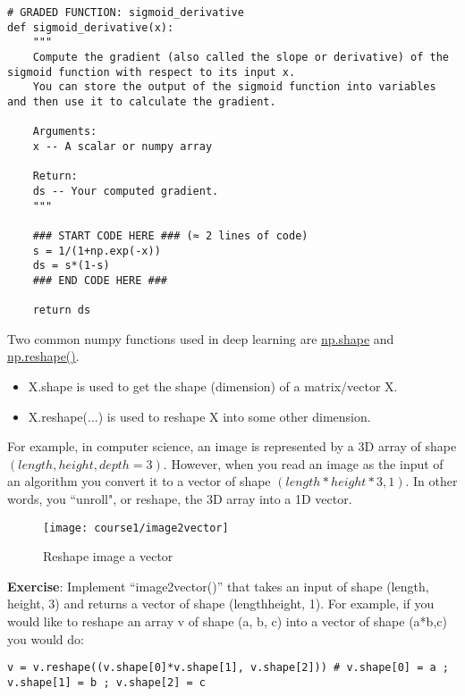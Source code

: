 \begin{verbatim}
# GRADED FUNCTION: sigmoid_derivative
def sigmoid_derivative(x):
    """
    Compute the gradient (also called the slope or derivative) of the sigmoid function with respect to its input x.
    You can store the output of the sigmoid function into variables and then use it to calculate the gradient.
    
    Arguments:
    x -- A scalar or numpy array

    Return:
    ds -- Your computed gradient.
    """
    
    ### START CODE HERE ### (≈ 2 lines of code)
    s = 1/(1+np.exp(-x))
    ds = s*(1-s)
    ### END CODE HERE ###
    
    return ds
\end{verbatim}



Two common numpy functions used in deep learning are \href{https://docs.scipy.org/doc/numpy/reference/generated/numpy.ndarray.shape.html}{np.shape} and \href{https://docs.scipy.org/doc/numpy/reference/generated/numpy.reshape.html}{np.reshape()}. 
\begin{itemize}
\item X.shape is used to get the shape (dimension) of a matrix/vector X. 
\item X.reshape(...) is used to reshape X into some other dimension. 
\end{itemize}

For example, in computer science, an image is represented by a 3D array of shape $(length, height, depth = 3)$. However, when you read an image as the input of an algorithm you convert it to a vector of shape $(length*height*3, 1)$. In other words, you ``unroll", or reshape, the 3D array into a 1D vector.

\begin{figure}[h]
\begin{center}
\texttt{[image: course1/image2vector]}
\end{center}
\caption{Reshape image a vector}
\end{figure}

{\textbf {Exercise}}: Implement ``image2vector()'' that takes an input of shape (length, height, 3) and returns a vector of shape (length\*height, 1). For example, if you would like to reshape an array v of shape (a, b, c) into a vector of shape (a*b,c) you would do:
\begin{verbatim}
v = v.reshape((v.shape[0]*v.shape[1], v.shape[2])) # v.shape[0] = a ; v.shape[1] = b ; v.shape[2] = c
\end{verbatim}


